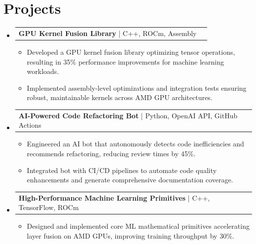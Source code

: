 \documentclass[letterpaper,11pt]{article}
\makeatletter
\newcommand{\resumeItem}[1]{
  \item\footnotesize{
    {#1 \vspace{-2pt}}
  }
}
\newcommand{\resumeProjectHeading}[2]{
    \item
    \begin{tabular*}{1.001\textwidth}{l@{\extracolsep{\fill}}r}
      \small#1 & \textbf{\small #2}\\
    \end{tabular*}\vspace{-7pt}
}
\newcommand{\resumeSubHeadingListStart}{\begin{itemize}[leftmargin=0pt, label={}]}
\newcommand{\resumeSubHeadingListEnd}{\end{itemize}}
\newcommand{\resumeItemListStart}{\begin{itemize}[leftmargin=*]}
\newcommand{\resumeItemListEnd}{\end{itemize}\vspace{-5pt}}
\makeatother
\begin{document}
\section{Projects}
    \vspace{-5pt}
    \resumeSubHeadingListStart
      \resumeProjectHeading
          {\textbf{GPU Kernel Fusion Library} | C++, ROCm, Assembly}{}
          \resumeItemListStart
              \resumeItem{Developed a GPU kernel fusion library optimizing tensor operations, resulting in 35\% performance improvements for machine learning workloads.}
              \resumeItem{Implemented assembly-level optimizations and integration tests ensuring robust, maintainable kernels across AMD GPU architectures.}
          \resumeItemListEnd
          \vspace{-12pt}
      \resumeProjectHeading
          {\textbf{AI-Powered Code Refactoring Bot} | Python, OpenAI API, GitHub Actions}{}
          \resumeItemListStart
              \resumeItem{Engineered an AI bot that autonomously detects code inefficiencies and recommends refactoring, reducing review times by 45\%.}
              \resumeItem{Integrated bot with CI/CD pipelines to automate code quality enhancements and generate comprehensive documentation coverage.}
          \resumeItemListEnd
          \vspace{-12pt}
      \resumeProjectHeading
          {\textbf{High-Performance Machine Learning Primitives} | C++, TensorFlow, ROCm}{}
          \resumeItemListStart
              \resumeItem{Designed and implemented core ML mathematical primitives accelerating layer fusion on AMD GPUs, improving training throughput by 30\%.}
          \resumeItemListEnd
    \resumeSubHeadingListEnd
\end{document}
